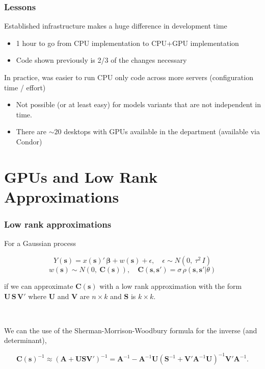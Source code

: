 \documentclass[t]{beamer}\usepackage[]{graphicx}\usepackage[]{color}
\begin{document}
\begin{frame}[label=pm_lessons]
\frametitle{Lessons}

Established infrastructure makes a huge difference in development time
\begin{itemize}
  \item 1 hour to go from CPU implementation to CPU+GPU implementation 
  \item Code shown previously is 2/3 of the changes necessary \hyperlink{code}{}
\end{itemize}

\vspace{2mm}
In practice, was easier to run CPU only code across more servers (configuration time / effort)

\begin{itemize}
\item Not possible (or at least easy) for models variants that are not independent in time.
\item There are $\sim20$ desktops with GPUs available in the department (available via Condor)
\end{itemize}

\end{frame}


\section{GPUs and Low Rank Approximations}


\begin{frame}
\frametitle{Low rank approximations}

For a Gaussian process

\[ Y(\bm{s}) = x(\bm{s})' \, \bm{\beta} + w(\bm{s}) + \epsilon, \quad \epsilon \sim N(0,~\tau^2 \, I) \]
%
\[ w(\bm{s}) \sim N(0,~\bm{C}(\bm{s})), \quad \bm{C}(\bm{s},\bm{s}')=\sigma\,\rho(\bm{s},\bm{s}'|\theta) \]

if we can approximate $\bm{C}(\bm{s})$ with a low rank approximation with the form $\bm{U}\,\bm{S}\,\bm{V}'$ where $\bm{U}$ and $\bm{V}$ are $n \times k$ and $\bm{S}$ is $k \times k$.

~\\\pause

We can the use of the Sherman-Morrison-Woodbury formula for the inverse (and determinant),

\[
\bm{C}(\bm{s})^{-1} \approx
\left(\bm{A} + \bm{U}\bm{S}\bm{V'}\right)^{-1} = 
\bm{A}^{-1} - \bm{A}^{-1} \bm{U} \left(\bm{S}^{-1}+\bm{V}' \bm{A}^{-1} \bm{U}\right)^{-1}\bm{V}' \bm{A}^{-1}.
\]


\end{frame}
\end{document}
